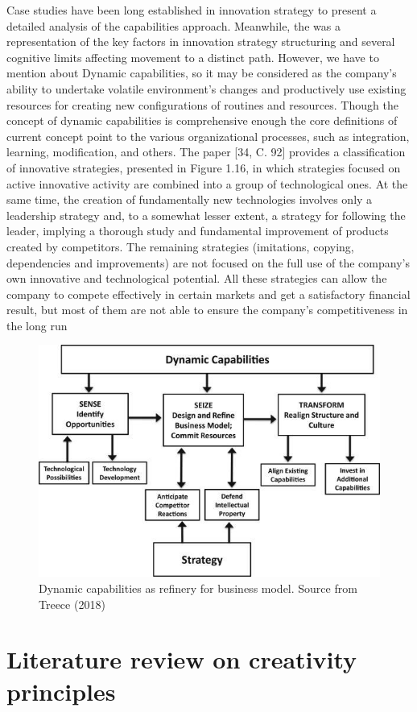 \documentclass[12pt,twoside]{reedthesis}
\begin{document}
Case studies have been long established in innovation strategy to present a detailed analysis of the capabilities approach. Meanwhile, the was a representation of the key factors in innovation strategy structuring and several cognitive limits affecting movement to a distinct path. However, we have to mention about Dynamic capabilities, so it may be considered as the company's ability to undertake volatile environment's changes and productively use existing resources for creating new configurations of routines and resources. Though the concept of dynamic capabilities is comprehensive enough the core definitions of current concept point to the various organizational processes, such as integration, learning, modification, and others. The paper {[}34, C. 92{]} provides a classification of innovative strategies, presented in Figure 1.16, in which strategies focused on active innovative activity are combined into a group of technological ones. At the same time, the creation of fundamentally new technologies involves only a leadership strategy and, to a somewhat lesser extent, a strategy for following the leader, implying a thorough study and fundamental improvement of products created by competitors. The remaining strategies (imitations, copying, dependencies and improvements) are not focused on the full use of the company's own innovative and technological potential. All these strategies can allow the company to compete effectively in certain markets and get a satisfactory financial result, but most of them are not able to ensure the company's competitiveness in the long run
\begin{figure}[h]

{\centering \includegraphics[width=0.8\linewidth,]{figure/3} 

}

\caption{Dynamic capabilities as refinery for business model. Source from Treece (2018)}\label{fig:unnamed-chunk-2}
\end{figure}
\hypertarget{literature-review-on-creativity-principles}{%
\section{Literature review on creativity principles}\label{literature-review-on-creativity-principles}}
\end{document}
